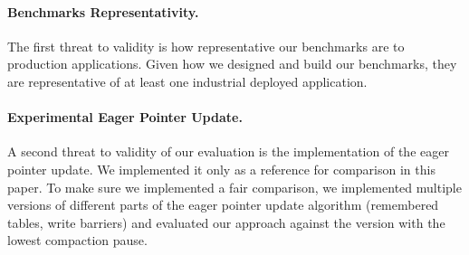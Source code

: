 \documentclass[sigplan,10pt,review,anonymous]{acmart}\settopmatter{printfolios=true,printccs=false,printacmref=false}
\newcommand{\egb}[1]{\color{blue}\fbox{\bfseries\sffamily\scriptsize Elisa:}{\sf\small$\blacktriangleright$\textit{#1}$\blacktriangleleft$}\color{black}}
\def\OpenSmalltalkVM{OpenSmalltalk-VM\xspace}
\begin{document}
\paragraph{Benchmarks Representativity.} 
\label{sec:repBench}
The first threat to validity is how representative our benchmarks are to production applications. Given how we designed and build our benchmarks, they are representative of at least one industrial deployed application. 

\paragraph{Experimental Eager Pointer Update.} 
\label{sec:expPU}
A second threat to validity of our evaluation is the implementation of the eager pointer update.
We implemented it only %
as a reference for comparison in this paper. 
To make sure we implemented a fair comparison, we implemented multiple versions of different parts of the eager pointer update algorithm (remembered tables, write barriers) and evaluated our approach against the version with the lowest compaction pause.  
\end{document}
